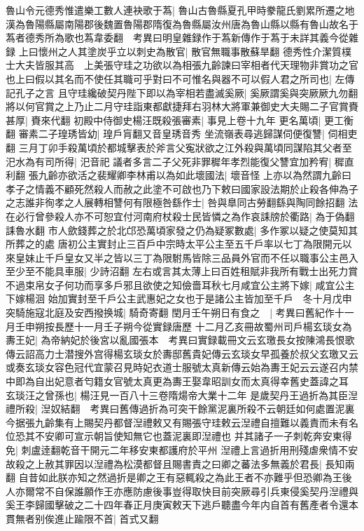 魯山令元德秀惟遣樂工數人連袂歌于蒍|{
	魯山古魯縣夏孔甲時豢龍氏劉累所遷之地漢為魯陽縣屬南陽郡後魏置魯陽郡隋復為魯縣屬汝州唐為魯山縣以縣有魯山故名于蒍者德秀所為歌也蒍韋委翻　考異曰明皇雜録作于蒍新傳作于蒍于未詳其義今從雜録}
上曰懷州之人其塗炭乎立以刺史為散官|{
	散官無職事散蘇旱翻}
德秀性介潔質樸士大夫皆服其高　上美張守珪之功欲以為相張九齡諫曰宰相者代天理物非賞功之官也上曰假以其名而不使任其職可乎對曰不可惟名與器不可以假人君之所司也|{
	左傳記孔子之言}
且守珪纔破契丹陛下即以為宰相若盡滅奚厥|{
	奚厥謂奚與突厥厥九勿翻}
將以何官賞之上乃止二月守珪詣東都獻捷拜右羽林大將軍兼御史大夫賜二子官賞賚甚厚|{
	賚來代翻}
初殿中侍御史楊汪既殺張審素|{
	事見上卷十九年}
更名萬頃|{
	更工衡翻}
審素二子瑝琇皆幼|{
	瑝戶肓翻又音皇琇音秀}
坐流嶺表尋逃歸謀伺便復讐|{
	伺相吏翻}
三月丁卯手殺萬頃於都城擊表於斧言父寃狀欲之江外殺與萬頃同謀陷其父者至汜水為有司所得|{
	汜音祀}
議者多言二子父死非罪穉年孝烈能復父讐宜加矜宥|{
	穉直利翻}
張九齡亦欲活之裴耀卿李林甫以為如此壞國法|{
	壞音怪}
上亦以為然謂九齡曰孝子之情義不顧死然殺人而赦之此塗不可啟也乃下敕曰國家設法期於止殺各伸為子之志誰非徇孝之人展轉相讐何有限極咎繇作士|{
	咎與臯同古勞翻繇與陶同餘招翻}
法在必行曾參殺人亦不可恕宜付河南府杖殺士民皆憐之為作哀誄牓於衢路|{
	為于偽翻誄魯水翻}
市人歛錢葬之於北邙恐萬頃家發之仍為疑冢數處|{
	多作冢以疑之使莫知其所葬之的處}
唐初公主實封止三百戶中宗時太平公主至五千戶率以七丁為限開元以來皇妹止千戶皇女又半之皆以三丁為限駙馬皆除三品員外官而不任以職事公主邑入至少至不能具車服|{
	少詩沼翻}
左右或言其太薄上曰百姓租賦非我所有戰士出死力賞不過束帛女子何功而享多戶邪且欲使之知儉嗇耳秋七月咸宜公主將下嫁|{
	咸宜公主下嫁楊洄}
始加實封至千戶公主武惠妃之女也于是諸公主皆加至千戶　冬十月戊申突騎施寇北庭及安西撥换城|{
	騎奇寄翻}
閏月壬午朔日有食之　|{
	考異曰舊紀作十一月壬申朔按長歷十一月壬子朔今從實録唐歷}
十二月乙亥冊故蜀州司戶楊玄琰女為夀王妃|{
	為帝納妃於後宮以亂國張本　考異曰實録載冊文云玄璬長女按陳鴻長恨歌傳云詔高力士潜搜外宫得楊玄琰女於夀邸舊貴妃傳云玄琰女早孤養於叔父玄璬又云或奏玄琰女容色冠代宜蒙召見時妃衣道士服號太真新傳云始為夀王妃云云遂召内禁中即為自出妃意者匄籍女官號太真更為夀王娶韋昭訓女而太真得幸舊史蓋諱之耳}
玄琰汪之曾孫也|{
	楊汪見一百八十三卷隋煬帝大業十二年}
是歲契丹王過折為其臣湼禮所殺|{
	湼奴結翻　考異曰舊傳過折為可突干餘黨泥裏所殺不云朝廷如何處置泥裏今据張九齡集有上賜契丹都督湼禮敕又有賜張守珪敕云湼禮自擅難以義責而未有名位恐其不安卿可宣示朝旨使知無它也蓋泥裏即湼禮也}
并其諸子一子刺乾奔安東得免|{
	刺盧逹翻乾音干開元二年移安東都護府於平州}
湼禮上言過折用刑殘虐衆情不安故殺之上赦其罪因以湼禮為松漠都督且賜書責之曰卿之蕃法多無義於君長|{
	長知兩翻}
自昔如此朕亦知之然過折是卿之王有惡輒殺之為此王者不亦難乎但恐卿為王後人亦爾常不自保誰願作王亦應防慮後事豈得取快目前突厥尋引兵東侵奚契丹湼禮與奚王李歸國擊破之二十四年春正月庚寅敕天下逃戶聽盡今年内自首有舊產者令還本貫無者别俟進止踰限不首|{
	首式又翻}
